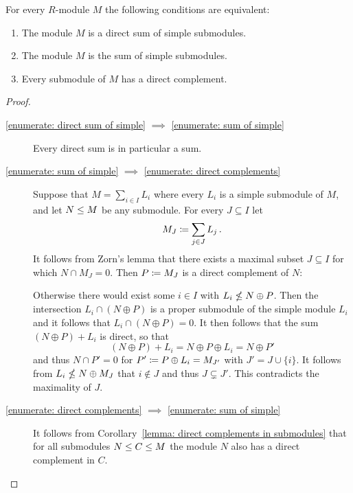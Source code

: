 \begin{proposition}
  \label{proposition: characterisation semisimple modules}
  For every $R$-module $M$ the following conditions are equivalent:
  \begin{enumerate}
    \item
      \label{enumerate: direct sum of simple}
      The module $M$ is a direct sum of simple submodules. 
    \item
      \label{enumerate: sum of simple}
      The module $M$ is the sum of simple submodules.
    \item
      \label{enumerate: direct complements}
      Every submodule of $M$ has a direct complement.
  \end{enumerate}
\end{proposition}


\begin{proof}
  \leavevmode
  \begin{description}
    \item[\ref*{enumerate: direct sum of simple} $\implies$ \ref*{enumerate: sum of simple}]
      Every direct sum is in particular a sum.
    \item[\ref*{enumerate: sum of simple} $\implies$ \ref*{enumerate: direct complements}]
      Suppose that $M = \sum_{i \in I} L_i$ where every $L_i$ is a simple submodule of $M$, and let $N \leq M$ be any submodule.
      For every $J \subseteq I$ let
      \[
                  M_J
        \coloneqq  \sum_{j \in J} L_j \,.
      \]
      It follows from Zorn’s lemma that there exists a maximal subset $J \subseteq I$ for which $N \cap M_J = 0$.
      Then $P \coloneqq M_J$ is a direct complement of $N$:
      
      Otherwise there would exist some $i \in I$ with $L_i \nleq N \oplus P$.
      Then the intersection $L_i \cap (N \oplus P)$ is a proper submodule of the simple module $L_i$ and it follows that $L_i \cap (N \oplus P) = 0$.
      It then follows that the sum $(N \oplus P) + L_i$ is direct, so that
      \[
          (N \oplus P) + L_i
        = N \oplus P \oplus L_i
        = N \oplus P'
      \]
      and thus $N \cap P' = 0$ for $P' \coloneqq P \oplus L_i = M_{J'}$ with $J' = J \cup \{i\}$.
      It follows from $L_i \nleq N \oplus M_J$ that $i \notin J$ and thus $J \subsetneq J'$.
      This contradicts the maximality of $J$.
    \item[\ref*{enumerate: direct complements} $\implies$ \ref*{enumerate: sum of simple}]
      It follows from Corollary~\ref{lemma: direct complements in submodules} that for all submodules $N \leq C \leq M$ the module $N$ also has a direct complement in $C$.
      

\end{description}
\end{proof}
